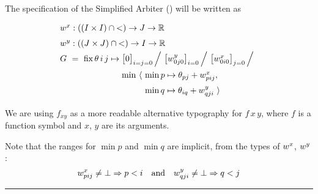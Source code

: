 \noindent
The specification of the Simplified Arbiter () will be written as
%
\begin{equation}
  \renewcommand\arraystretch{1.5}
  \begin{array}{@{}l@{}l@{}l@{}}
    \lspan3{\xw{} : ((I\times I)\cap{<})\to J\to\R} \\
    \lspan3{\yw{} : ((J\times J)\cap{<})\to I\to\R} \\
    G ~=~ \fix \theta\,i\,j\mapsto{}
      & \lspan2{\big[0\big]_{i=j=0} \,\Big/~ \big[\yw{0j0}\big]_{i=0} \,\Big/~ \big[\xw{0i0}\big]_{j=0} \,\Big/} \\
      & \min~\langle~ & \min p\mapsto\theta_{pj}+\xw{pij}, \\
      & & \min q\mapsto\theta_{iq}+\yw{qji} ~\rangle
  \end{array}
  \label{lang:arbiter spec}
\end{equation}

\medskip
We are using $f_{xy}$
as a more readable alternative typography for $f\,x\,y$,
where $f$ is a function symbol and $x$, $y$ are its arguments.

Note that the ranges for $\min p$ and $\min q$ are implicit, from the types of
$w^x_{}$, $w^y_{}$: \[w^x_{pij}\neq\bot\Rightarrow p<i \quad \mbox{and} \quad w^y_{qji}\neq\bot\Rightarrow q<j\]

\medskip
\hrule
